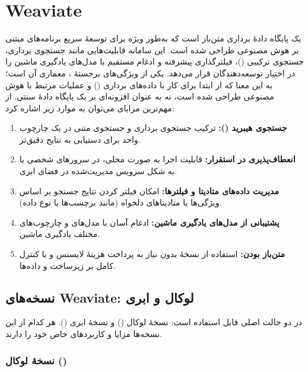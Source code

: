\documentclass{article}
\begin{document}
\section{Weaviate}
 یک پایگاه دادهٔ برداری متن‌باز است که به‌طور ویژه برای توسعهٔ سریع برنامه‌های مبتنی بر هوش مصنوعی طراحی شده است.
این سامانه قابلیت‌هایی مانند جستجوی برداری، جستجوی ترکیبی ()، فیلترگذاری پیشرفته و ادغام مستقیم با مدل‌های یادگیری ماشین را در اختیار توسعه‌دهندگان قرار می‌دهد.
یکی از ویژگی‌های برجستهٔ ، معماری  آن است؛ به این معنا که از ابتدا برای کار با داده‌های برداری () و عملیات مرتبط با هوش مصنوعی طراحی شده است، نه به عنوان افزونه‌ای بر یک پایگاه دادهٔ سنتی.
از مهم‌ترین مزایای  می‌توان به موارد زیر اشاره کرد:
\begin{enumerate}
\item \textbf{جستجوی هیبرید ():} ترکیب جستجوی برداری و جستجوی متنی در یک چارچوب واحد برای دستیابی به نتایج دقیق‌تر.

\item \textbf{انعطاف‌پذیری در استقرار:} قابلیت اجرا به صورت محلی، در سرورهای شخصی یا به شکل سرویس مدیریت‌شده در فضای ابری.

\item \textbf{مدیریت داده‌های متادیتا و فیلترها:} امکان فیلتر کردن نتایج جستجو بر اساس ویژگی‌ها یا متادیتاهای دلخواه (مانند برچسب‌ها یا نوع داده).

\item \textbf{پشتیبانی از مدل‌های یادگیری ماشین:} ادغام آسان با مدل‌های  و چارچوب‌های مختلف یادگیری ماشین.

\item \textbf{متن‌باز بودن:} استفاده از نسخهٔ  بدون نیاز به پرداخت هزینهٔ لایسنس و با کنترل کامل بر زیرساخت و داده‌ها.

\end{enumerate}

\subsection{نسخه‌های Weaviate: لوکال و ابری}
 در دو حالت اصلی قابل استفاده است: نسخهٔ لوکال () و نسخهٔ ابری ().
هر کدام از این نسخه‌ها مزایا و کاربردهای خاص خود را دارند.

\subsubsection{نسخهٔ لوکال ()}
\end{document}
